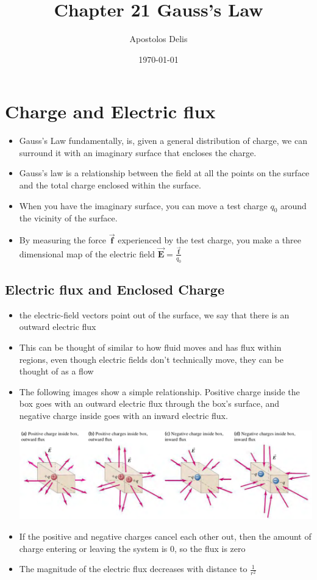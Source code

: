 \documentclass[11pt, a4paper]{article}
\begin{document}
\title{Chapter 21 Gauss's Law}
\author{Apostolos Delis}
\date{\today}
\maketitle

\tableofcontents
\section[22.1 Charge and Electric flux]{Charge and Electric flux}
\begin{itemize}
    \item Gauss's Law fundamentally, is, given a general distribution of charge, we can
        surround it with an imaginary surface that encloses the charge.
    \item  Gauss's law is a relationship between the field at all the points on the
        surface and the total charge enclosed within the surface.
    \item When you have the imaginary surface, you can move a test charge $q_0$ around
        the vicinity of the surface.
    \item By measuring the force $\vec{\mathbf{f}}$ experienced by the test charge, you
        make a three dimensional map of the electric field
        $\vec{\mathbf{E}} = \frac{\vec{\mathbf{f}}}{q_0}$
\end{itemize}
\subsection{Electric flux and Enclosed Charge}
\begin{itemize}
    \item  the electric-field vectors point out of the surface, we say that there is an
        outward electric flux
    \item This can be thought of similar to how fluid moves and has flux within regions,
        even though electric fields don't technically move, they can be thought of as
        a flow
    \item The following images show a simple relationship. Positive charge inside the
        box goes with an outward electric flux through the box's surface, and negative
        charge inside goes with an inward electric flux.

\includegraphics[scale=0.65]{images/electric_flux.png}

    \item If the positive and negative charges cancel each other out, then the amount of
        charge entering or leaving the system is 0, so the flux is zero
    \item The magnitude of the electric flux decreases with distance to $\frac{1}{r^2}$
\end{itemize}
\end{document}
